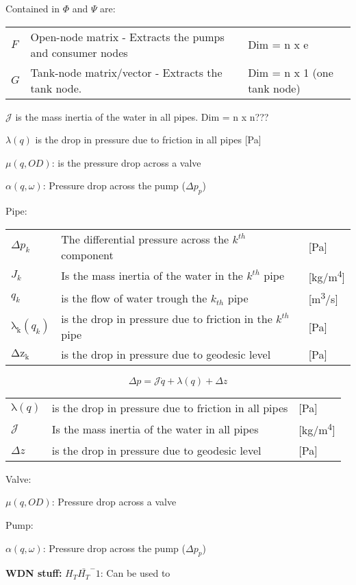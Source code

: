 Contained in $\Phi$ and $\Psi$ are:
\begin{center}
	\begin{tabular}{l p{10cm} l}
		$F$ & Open-node matrix - Extracts the pumps and consumer nodes & Dim = n x e \\
		$G$ & Tank-node matrix/vector - Extracts the tank node. & Dim = n x 1 (one tank node) 
	\end{tabular}
\end{center}

$ \mathcal{J}$ is the mass inertia of the water in all pipes. Dim =  n x n???

$\lambda (q)$ is the drop in pressure due to friction in all pipes [\si{Pa}]

$\mu(q,OD)$: is the pressure drop across a valve

$\alpha(q,\omega)$: Pressure drop across the pump ($\Delta p_p$)


Pipe:
\begin{center}
	\begin{tabular}{l p{10cm} l}
		
		$\Delta{p_{k}}$ & The differential pressure across the $k^{th}$ component & [\si{Pa}]\\ 
		${J_{k}}$ & Is the mass inertia of the water in the $k^{th}$ pipe & [\si{kg}/\si{m^{4}}] \\
		$q_{k}$ & is the flow of water trough the $k_{th}$ pipe & [{\si{\meter\cubed}/\si{s}}] \\
		$\mathrm{\lambda_{k}}(q_{k})$ & is the drop in pressure due to friction in the $k^{th}$ pipe & [\si{Pa}] \\
		$\mathrm{\Delta{z_{k}}}$ & is the drop in pressure due to geodesic level & [\si{Pa}]\\
	\end{tabular}
\end{center}


\begin{equation}
	\Delta{p} = \mathcal{J}\dot{q} + \lambda(q) + \Delta z
\end{equation}

\begin{center}
	\begin{tabular}{l p{10cm} l}
		$\mathrm{\lambda}(q)$ & is the drop in pressure due to friction in all pipes & [\si{Pa}] \\
		$ \mathcal{J}$ & Is the mass inertia of the water in all pipes & [\si{kg}/\si{m^{4}}] \\
		$\Delta z$ & is the drop in pressure due to geodesic level & [\si{Pa}]\\
	\end{tabular}
\end{center}


Valve:

$\mu(q,OD)$: Pressure drop across a valve

Pump:

$\alpha(q,\omega)$: Pressure drop across the pump ($\Delta p_p$)


\textbf{WDN stuff:}
$H_T \bar{H_T}^-1$: Can be used to


